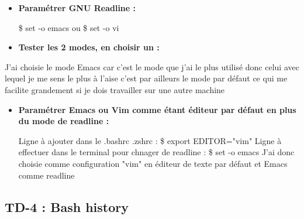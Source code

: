 \documentclass[12pt]{article}
\begin{document}
\vspace{0.3cm}

\begin{itemize}
  \item \textbf{Paramétrer GNU Readline :}
  \vspace{0.3cm}

  \$ set -o emacs \newline
  ou \newline
  \$ set -o vi \newline
\end{itemize}

\begin{itemize}
  \item \textbf{Tester les 2 modes, en choisir un :}
\end{itemize}
\vspace{0.3cm}

J'ai choisie le mode Emacs car c'est le mode que j'ai le plus utilisé donc celui avec lequel je me sens le plus à l'aise
c'est par ailleurs le mode par défaut ce qui me facilite grandement si je dois travailler sur une autre machine

\vspace{0.3cm}

\begin{itemize}
  \item \textbf{Paramétrer Emacs ou Vim comme étant éditeur par défaut en plus du mode de readline :}

  \vspace{0.3cm}

  Ligne à ajouter dans le .bashrc .zshrc :
  \vspace{0.3cm} \newline
  \$ export EDITOR="vim"
  \vspace{0.3cm} \newline
  Ligne à effectuer dans le terminal pour chnager de readline :
  \vspace{0.3cm} \newline
  \$ set -o emacs \newline
  \newline
  J'ai donc choisie comme configuration "vim" en éditeur de texte par défaut et Emacs comme readline
\end{itemize}

  \subsection{TD-4 : Bash history}
  \vspace{0.3cm}
\end{document}
